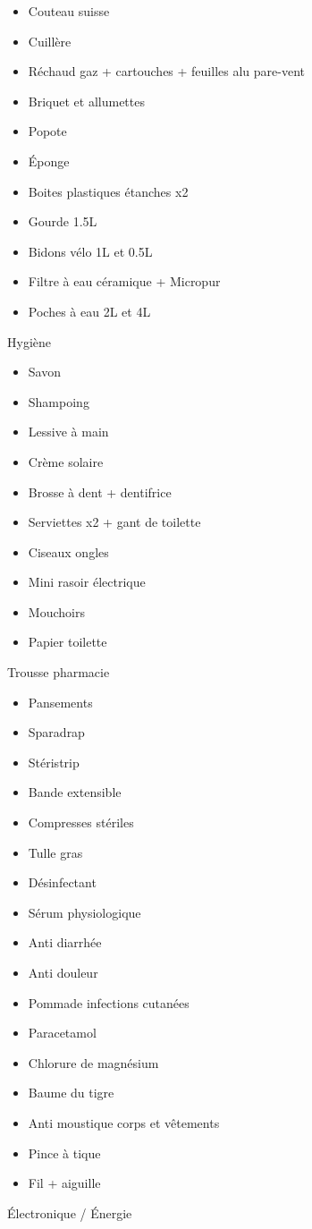  \begin{itemize}
 \item Couteau suisse
 \item Cuillère
 \item Réchaud gaz + cartouches + feuilles alu pare-vent
 \item Briquet et allumettes
 \item Popote
 \item Éponge
 \item Boites plastiques étanches x2
 \item Gourde 1.5L
 \item Bidons vélo 1L et 0.5L
 \item Filtre à eau céramique + Micropur
 \item Poches à eau 2L et 4L
 \end{itemize}
 Hygiène

 \begin{itemize}
 \item Savon
 \item Shampoing
 \item Lessive à main
 \item Crème solaire
 \item Brosse à dent + dentifrice
 \item Serviettes x2 + gant de toilette
 \item Ciseaux ongles
 \item Mini rasoir électrique
 \item Mouchoirs
 \item Papier toilette
 \end{itemize}
 Trousse pharmacie

 \begin{itemize}
 \item Pansements
 \item Sparadrap
 \item Stéristrip
 \item Bande extensible
 \item Compresses stériles
 \item Tulle gras
 \item Désinfectant
 \item Sérum physiologique
 \item Anti diarrhée
 \item Anti douleur
 \item Pommade infections cutanées
 \item Paracetamol
 \item Chlorure de magnésium
 \item Baume du tigre
 \item Anti moustique corps et vêtements
 \item Pince à tique
 \item Fil + aiguille
 \end{itemize}
 Électronique / Énergie

